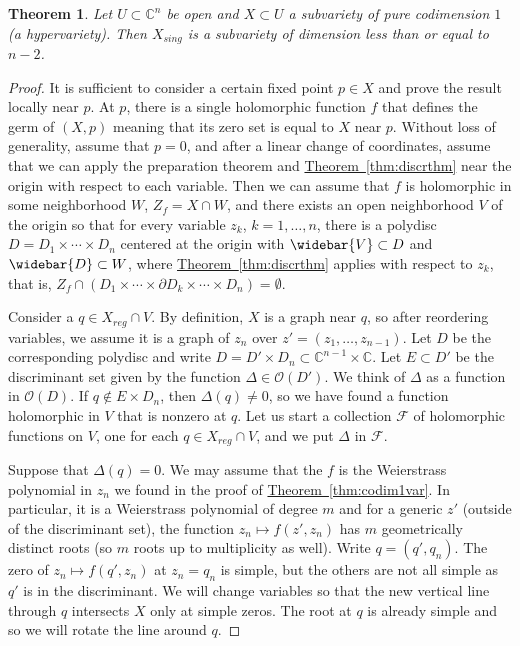 \documentclass[12pt,openany]{book}
\newcommand{\C}{{\mathbb{C}}}
\newcommand{\sF}{{\mathscr{F}}}
\newcommand{\sO}{{\mathscr{O}}}
\theoremstyle{plain}
\newtheorem{thm}{Theorem}[section]
\theoremstyle{remark}
\theoremstyle{definition}
\theoremstyle{exercise}
\theoremstyle{example}
\newcommand{\thmref}[1]{\hyperref[#1]{Theorem~\ref*{#1}}}
\begin{document}
\begin{thm} \label{thm:hypervarsingularity}
Let $U \subset \C^n$ be open and $X \subset U$
a subvariety of pure codimension $1$ (a hypervariety).
Then $X_{\mathit{sing}}$ is a subvariety of dimension less than or equal to
$n-2$.
\end{thm}

\begin{proof}
It is sufficient to consider a certain fixed point $p \in X$ and prove the
result locally near $p$.
At $p$, there is a single holomorphic function $f$ that defines the germ of
$(X,p)$ meaning that its zero set is equal to $X$ near $p$.
Without loss of generality, assume that $p=0$,
and after a linear change of coordinates, assume that we can apply
the preparation theorem and \thmref{thm:discrthm}
near the origin with
respect to each variable.
Then we can assume that $f$ is holomorphic in some neighborhood $W$,
$Z_f = X \cap W$, and
there exists an open neighborhood $V$ of the origin so that for every
variable $z_k$, $k=1,\ldots,n$, there is a polydisc $D=D_1 \times \cdots
\times D_n$ centered at the origin with
$\widebar{V} \subset D$ and $\widebar{D} \subset W$, where
\thmref{thm:discrthm} applies with respect to $z_k$, that is,
$Z_f \cap
(D_1 \times \cdots \times \partial D_k \times \cdots \times D_n)
= \emptyset$.

Consider a $q \in X_{\textit{reg}} \cap V$.  By definition, $X$ is a graph
near $q$, so after reordering variables,
we assume it is a graph of $z_n$
over $z'=(z_1,\ldots,z_{n-1})$.
Let $D$ be the corresponding polydisc and
write $D = D' \times D_n \subset \C^{n-1} \times \C$.  Let $E \subset D'$
be the discriminant set given by the function $\Delta \in \sO(D')$.
We think of $\Delta$ as a function in $\sO(D)$.
If $q \not\in E \times D_n$, then $\Delta(q) \not= 0$, so we have
found a function holomorphic in $V$ that is nonzero at $q$.
Let us start a collection $\sF$ of holomorphic functions on $V$,
one for each $q \in X_{\mathit{reg}} \cap V$,
and we put $\Delta$ in $\sF$.

Suppose that $\Delta(q) = 0$.
We may assume that the $f$ is the Weierstrass polynomial
in $z_n$ we found in the proof of \thmref{thm:codim1var}.  In particular, it is
a Weierstrass polynomial of degree $m$ and
for a generic $z'$ (outside of the discriminant set),
the function $z_n \mapsto f(z',z_n)$ has $m$ geometrically distinct roots
(so $m$ roots up to multiplicity as well).
Write $q = (q',q_n)$.
The zero of $z_n \mapsto f(q',z_n)$ at $z_n=q_n$ is simple, but the others
are not all simple as $q'$ is in the discriminant.
We will change variables so that the new vertical line through $q$
intersects $X$ only at simple zeros.  The root at $q$
is already simple and so we will rotate the line around $q$.


\end{proof}
\end{document}
